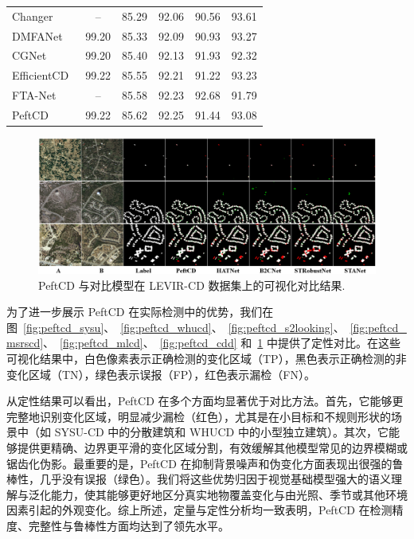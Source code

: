 \begin{table}[!htbp]
\begin{tabular}{l c c c c c}
    Changer~\cite{Fang2022ChangerFI}        &   --   &  85.29 &  92.06 &  90.56 &  93.61  \\
    DMFANet~\cite{Zhan2025DifferenceAwareMF}         &  99.20 &  85.33 &  92.09 &  90.93 &  93.27  \\
    CGNet~\cite{han_change_2023}            &  99.20 &  85.40 &  92.13 &  91.93 &  92.32  \\
    EfficientCD~\cite{dong_efficientcd_2024} &  99.22 &  85.55 &  92.21 &  91.22 &  93.23  \\
    FTA-Net~\cite{t_zhu_fta-net_2025}   & -- & 85.58 & 92.23 & 92.68 & 91.79 \\
\midrule
PeftCD  & 99.22 & 85.62 & 92.25 & 91.44 & 93.08 \\
\bottomrule
\end{tabular}
\end{table}

\begin{figure}[!htbp]
  \centering
  \includegraphics[width=\textwidth]{paper_figures/基于AI基础模型微调的变化检测模型研究/PeftCD/peftcd_levir.png}
  \caption{PeftCD 与对比模型在 LEVIR-CD 数据集上的可视化对比结果.}
  \label{fig:peftcd_levir}
\end{figure}


为了进一步展示 PeftCD 在实际检测中的优势，我们在图~\ref{fig:peftcd_sysu}、~\ref{fig:peftcd_whucd}、~\ref{fig:peftcd_s2looking}、~\ref{fig:peftcd_msrscd}、~\ref{fig:peftcd_mlcd}、~\ref{fig:peftcd_cdd} 和~\ref{fig:peftcd_levir} 中提供了定性对比。在这些可视化结果中，白色像素表示正确检测的变化区域（TP），黑色表示正确检测的非变化区域（TN），绿色表示误报（FP），红色表示漏检（FN）。  

从定性结果可以看出，PeftCD 在多个方面均显著优于对比方法。首先，它能够更完整地识别变化区域，明显减少漏检（红色），尤其是在小目标和不规则形状的场景中（如 SYSU-CD 中的分散建筑和 WHUCD 中的小型独立建筑）。其次，它能够提供更精确、边界更平滑的变化区域分割，有效缓解其他模型常见的边界模糊或锯齿化伪影。最重要的是，PeftCD 在抑制背景噪声和伪变化方面表现出很强的鲁棒性，几乎没有误报（绿色）。我们将这些优势归因于视觉基础模型强大的语义理解与泛化能力，使其能够更好地区分真实地物覆盖变化与由光照、季节或其他环境因素引起的外观变化。综上所述，定量与定性分析均一致表明，PeftCD 在检测精度、完整性与鲁棒性方面均达到了领先水平。  


